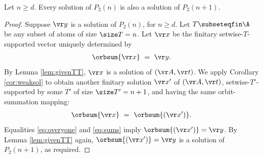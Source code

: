 \begin{lemma}[Monotonicity] \label{lem:monoto}
Let $n\geq d$. Every solution of $P_2(n)$ is also a solution 
of $P_2(n+1)$.
\end{lemma}
%
\begin{proof}
Suppose ${\vr y}$ is a solution of $P_2(n)$, for $n\geq d$.
Let $T\subseteqfin\A$ be any subset of atoms of size $\size T = n$.
Let $\vr x$ be the finitary setwise-$T$-supported vector uniquely determined by
%
\begin{align} \label{eq:overyone}
\orbsum {\vr x} \ = \  {\vr y}.
\end{align}
%
By Lemma \ref{lem:givenTT}, $\vr x$ is a solution of $(\vr A, \vr t)$.
We apply Corollary \ref{cor:weaksol} to obtain another finitary solution 
$\vr x'$ of $(\vr A, \vr t)$, 
setwise-$T'$-supported by some $T'$ of size $\size T' = n+1$,
and having the same orbit-summation mapping:
%
\begin{align}\label{eq:sums}
\orbsum {\vr x} \ = \  \orbsum {(\vr x')}.
\end{align}
%
Equalities \eqref{eq:overyone} and \eqref{eq:sums} imply $ \orbsum {(\vr x')} = {\vr y}$.
By Lemma \ref{lem:givenTT} again, $ \orbsum {(\vr x')} = {\vr y}$
is a solution of $P_2(n+1)$, as required.
\end{proof}

%
%
%


